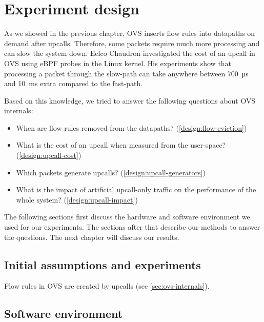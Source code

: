 \chapter{Experiment design}
\label{chap:env}

As we showed in the previous chapter, OVS inserts flow rules into datapaths on demand after upcalls. Therefore, some packets require much more processing and can slow the system down. Eelco Chaudron investigated the cost of an upcall in OVS using eBPF probes in the Linux kernel. His experiments show that processing a packet through the slow-path can take anywhere between \qty{700}{\us} and \qty{10}{\ms} extra compared to the fast-path.

Based on this knowledge, we tried to answer the following questions about OVS internals:

\begin{itemize}
    \item When are flow rules removed from the datapaths? (\cref{design:flow-eviction})
    \item What is the cost of an upcall when measured from the user-space? (\cref{design:upcall-cost})
    \item Which packets generate upcalls? (\cref{design:upcall-generators})
    \item What is the impact of artificial upcall-only traffic on the performance of the whole system? (\cref{design:upcall-impact})
\end{itemize}

The following sections first discuss the hardware and software environment we used for our experiments. The sections after that describe our methods to answer the questions. The next chapter will discuss our results.



\section{Initial assumptions and experiments}
\label{sec:init-assum}

Flow rules in OVS are created by upcalls (see \cref{sec:ovs-internals}). 


\section{Software environment}
\label{sec:sw-env}

